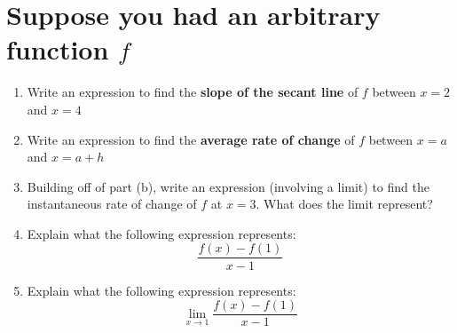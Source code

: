 \documentclass[10pt]{article}
\begin{document}
\section{Suppose you had an arbitrary function $f$}
\begin{enumerate}
    \item[(a)] Write an expression to find the \textbf{slope of the secant line} of $f$ between $x = 2$ and $x = 4$
        \vfill
    \item[(b)] Write an expression to find the \textbf{average rate of change} of $f$ between $x = a$ and $x = a+h$
        \vfill
    \item[(c)] Building off of part (b), write an expression (involving a limit) to find the instantaneous rate of change of $f$ at $x = 3$. What does the limit represent?
        \vfill
    \item[(d)] Explain what the following expression represents:
    \[\frac{f(x) - f(1)}{x - 1}\]
        \vfill
    \item[(e)] Explain what the following expression represents:
    \[\lim_{x \to 1}\frac{f(x) - f(1)}{x - 1}\]
        \vfill

    
    \end{enumerate}



\end{document}
